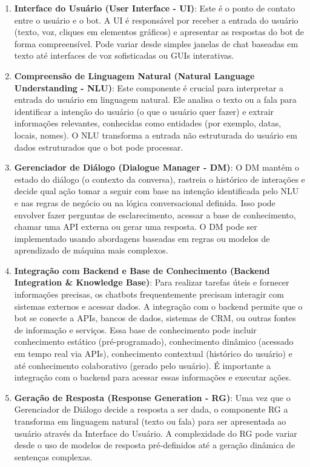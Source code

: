 \begin{enumerate}
\item \textbf{Interface do Usuário (User Interface - UI)}: Este é o ponto de contato entre o usuário e o bot. A UI é responsável por receber a entrada do usuário (texto, voz, cliques em elementos gráficos) e apresentar as respostas do bot de forma compreensível. Pode variar desde simples janelas de chat baseadas em texto até interfaces de voz sofisticadas ou GUIs interativas.
\item \textbf{Compreensão de Linguagem Natural (Natural Language Understanding - NLU)}: Este componente é crucial para interpretar a entrada do usuário em linguagem natural. Ele analisa o texto ou a fala para identificar a intenção do usuário (o que o usuário quer fazer) e extrair informações relevantes, conhecidas como entidades (por exemplo, datas, locais, nomes). O NLU transforma a entrada não estruturada do usuário em dados estruturados que o bot pode processar.
\item \textbf{Gerenciador de Diálogo (Dialogue Manager - DM)}: O DM mantém o estado do diálogo (o contexto da conversa), rastreia o histórico de interações e decide qual ação tomar a seguir com base na intenção identificada pelo NLU e nas regras de negócio ou na lógica conversacional definida. Isso pode envolver fazer perguntas de esclarecimento, acessar a base de conhecimento, chamar uma API externa ou gerar uma resposta. O DM pode ser implementado usando abordagens baseadas em regras ou modelos de aprendizado de máquina mais complexos.
\item \textbf{Integração com Backend e Base de Conhecimento (Backend Integration \& Knowledge Base)}: Para realizar tarefas úteis e fornecer informações precisas, os chatbots frequentemente precisam interagir com sistemas externos e acessar dados. A integração com o backend permite que o bot se conecte a APIs, bancos de dados, sistemas de CRM, ou outras fontes de informação e serviços. Essa base de conhecimento pode incluir conhecimento estático (pré-programado), conhecimento dinâmico (acessado em tempo real via APIs), conhecimento contextual (histórico do usuário) e até conhecimento colaborativo (gerado pelo usuário). É importante a integração com o backend para acessar essas informações e executar ações.
\item \textbf{Geração de Resposta (Response Generation - RG)}: Uma vez que o Gerenciador de Diálogo decide a resposta a ser dada, o componente RG a transforma em linguagem natural (texto ou fala) para ser apresentada ao usuário através da Interface do Usuário. A complexidade do RG pode variar desde o uso de modelos de resposta pré-definidos até a geração dinâmica de sentenças complexas.
\end{enumerate}

